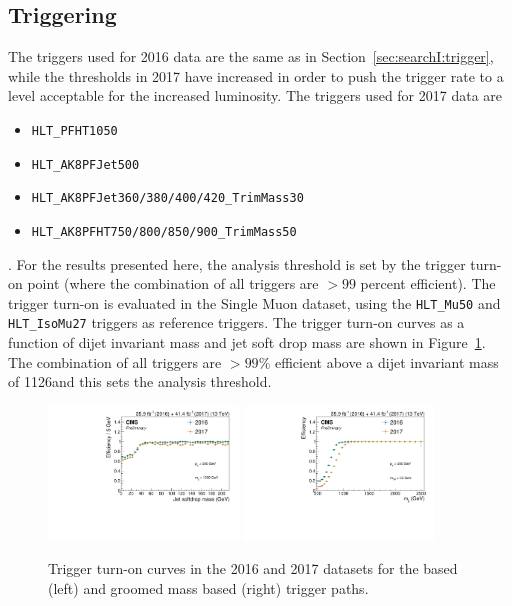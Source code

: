 \subsection{Triggering}
\label{sec:searchIII:trigger}
The triggers used for 2016 data are the same as in Section~\ref{sec:searchI:trigger}, while the thresholds in 2017 have increased in order to push the trigger rate to a level acceptable for the increased luminosity. The triggers used for 2017 data are
\begin{itemize}
\item \texttt{HLT\_PFHT1050}
\item \texttt{HLT\_AK8PFJet500}
\item \texttt{HLT\_AK8PFJet360/380/400/420\_TrimMass30}
\item \texttt{HLT\_AK8PFHT750/800/850/900\_TrimMass50}
\end{itemize}.
For the results presented here, the analysis threshold is set by the trigger turn-on point (where the combination of all triggers are $>99$ percent efficient). The trigger turn-on is evaluated in the Single Muon dataset, using the \texttt{HLT\_Mu50} and \texttt{HLT\_IsoMu27} triggers as reference triggers.  The trigger turn-on curves as a function of dijet invariant mass and jet soft drop mass are shown in Figure~\ref{fig:searchIII:trigturnon}.
The combination of all triggers are $>99\%$ efficient above a dijet invariant mass of 1126\GeV and this sets the analysis threshold. 
\begin{figure}[htb]
\centering 
\includegraphics[width=0.45\textwidth]{figures/analysis/search3/B2G-18-002/Combined_mj1_16vs17.pdf}
\includegraphics[width=0.45\textwidth]{figures/analysis/search3/B2G-18-002/Combined_mjj_16vs17.pdf}
\caption{Trigger turn-on curves in the 2016 and 2017 datasets for the \HT based (left) and groomed mass based (right) trigger paths.}
\label{fig:searchIII:trigturnon}
\end{figure}


